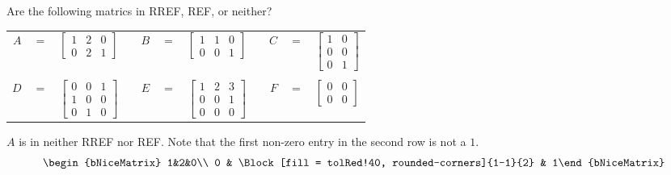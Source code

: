 \begin{example}
\end{example}

\begin{example}
	Are the following matrics in RREF, REF, or neither?
	
	\begin{center}
		\setlength{\tabcolsep}{2pt}
		\begin{tabular}{rclcrclcrcl}
			$A$ & $=$ & $\begin{bmatrix} 1&2&0\\ 0 & 2 & 1\end{bmatrix}$ &\phantom{a}\hspace{20pt}\phantom{a}& $B$ & $=$ & $\begin{bmatrix} 1& 1 & 0 \\ 0 & 0 &1 \end{bmatrix}$ &\phantom{a}\hspace{20pt}\phantom{a}& $C$ & $=$ & $\begin{bmatrix} 1 & 0 \\ 0 & 0 \\ 0 & 1\end{bmatrix}$\\\\
			$D$ & $=$ &  $\begin{bmatrix} 0 & 0 & 1\\ 1 & 0 & 0 \\ 0 & 1 & 0  \end{bmatrix}$ &\phantom{a}\hspace{20pt}\phantom{a}&
			$E$ & $=$ & $\begin{bmatrix} 1 & 2 & 3\\ 0 & 0 & 1\\ 0 & 0  & 0 \end{bmatrix}$ &\phantom{a}\hspace{20pt}\phantom{a}& $F$ & $=$ & $\begin{bmatrix} 0 & 0 \\ 0 & 0 \end{bmatrix}$
		\end{tabular}
	\end{center}
	
	
	\noindent $A$ is in neither RREF nor REF. Note that the first non-zero entry in the second row is not a $1$.
	\[\begin{bNiceMatrix} 1&2&0\\ 0 & \Block[fill = tolRed!40, rounded-corners]{1-1}{2} & 1\end{bNiceMatrix}\]
	

\end{example}
